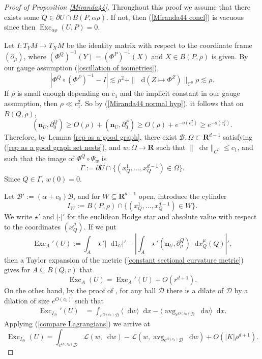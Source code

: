 \documentclass[final,12pt, leqno]{brownthesis}
\newcommand{\RR}{\mathbf{R}}
\DeclareMathOperator{\avg}{avg}
\DeclareMathOperator{\Exc}{Exc}
\newcommand*\dif{\mathop{}\!\mathrm{d}}
\newcommand{\Lagrange}{\mathscr L}
\newcommand{\normal}{\mathbf n}
\theoremstyle{definition}
\numberwithin{equation}{section}
\begin{document}
\begin{proof}[Proof of Proposition \ref{Miranda44}]
Throughout this proof we assume that there exists some $Q \in \partial U \cap B(P, \alpha \rho)$.
If not, then (\ref{Miranda44 concl}) is vacuous since then $\Exc_{\alpha \rho} (U, P) = 0$.

Let $I: T_YM \to T_XM$ be the identity matrix with respect to the coordinate frame $(\partial_\mu)$, where $(\Phi^Q)^{-1}(Y) = (\Phi^P)^{-1}(X)$ and $X \in B(P, \rho)$ is given.
By our gauge assumption (\ref{oscillation of isometries}),
$$|\Phi^Q \circ (\Phi^P)^{-1} - I| \lesssim \rho^2 + \|\dif(Z \mapsto \Phi^Z)\|_{C^0} \rho \lesssim \rho.$$
If $\rho$ is small enough depending on $c_1$ and the implicit constant in our gauge assumption, then $\rho \ll c_1^2$.
So by (\ref{Miranda44 normal hyp}), it follows that on $B(Q, \rho)$,
$$(\normal_U, \partial^Q_0) \geq O(\rho) + (\normal_U, \partial^P_0) \geq O(\rho) + e^{-o(c_1^2)} \geq e^{-o(c_1^2)}.$$
Therefore, by Lemma \ref{rep as a good graph},
there exist $\mathscr B, \Omega \subset \RR^{d - 1}$ satisfying (\ref{rep as a good graph set nests}), and $w: \Omega \to \RR$ such that $\|\dif w\|_{C^0} \leq c_1$, and such that the image of $\Phi^Q \circ \Psi_w$ is
$$\Gamma := \partial U \cap \{(x_Q^1, \dots, x_Q^{d - 1}) \in \Omega\}.$$
Since $Q \in \Gamma$, $w(0) = 0$.

Let $\mathscr B' := (\alpha + c_0) \mathscr B$, and for $W \subseteq \RR^{d - 1}$ open, introduce the cylinder
$$I_W := B(P, \rho) \cap \{(x^1_Q, \dots, x^{d - 1}_Q) \in W\}.$$
We write $\star'$ and $|\cdot|'$ for the euclidean Hodge star and absolute value with respect to the coordinates $(x^\mu_Q)$.
If we put
$$\Exc_A'(U) := \int_A \star' |\dif 1_U|' - \left|\int_A \star' (\normal_U, \partial^Q_\mu) \dif x^\mu_Q(Q)\right|',$$
then a Taylor expansion of the metric (\ref{constant sectional curvature metric}) gives for $A \subseteq B(Q, r)$ that
$$\Exc_A(U) = \Exc_A'(U) + O(r^{d + 1}).$$
On the other hand, by the proof of \cite[Lemma 6.4]{Giusti77}, for any ball $\mathscr D$ there is a dilate of $\mathscr D$ by a dilation of size $e^{O(c_0)}$ such that
\begin{align*}
\Exc_{I_{\mathscr D}}'(U) &= \int_{e^{O(c_0)} \mathscr D} \langle \dif w\rangle \dif x - \langle \avg_{e^{O(c_0)} \mathscr D} \dif w\rangle \dif x.
\end{align*}
Applying (\ref{compare Lagrangians}) we arrive at
\begin{equation}\label{excess versus lagrangian}
\Exc_{I_{\mathscr D}}(U) = \int_{e^{O(c_0)} \mathscr D} \Lagrange(w, \dif w) - \Lagrange(w, \avg_{e^{O(c_0)} \mathscr D} \dif w) + O(|K| \rho^{d + 1}).
\end{equation}


\end{proof}
\end{document}
